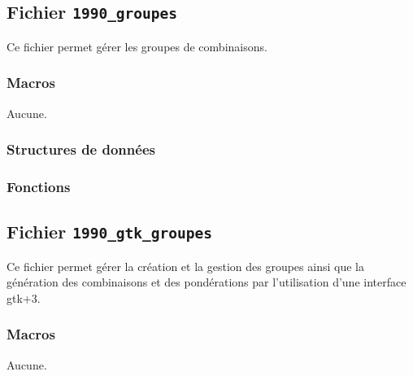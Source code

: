 \documentclass{article}
\begin{document}
\subsection{Fichier {\texttt{1990\_groupes}}}
Ce fichier permet gérer les groupes de combinaisons.
\subsubsection{Macros}
Aucune.
\subsubsection{Structures de données}




\subsubsection{Fonctions}
























\subsection{Fichier {\texttt{1990\_gtk\_groupes}}}
Ce fichier permet gérer la création et la gestion des groupes ainsi que la génération des combinaisons et des pondérations par l'utilisation d'une interface gtk+3.
\subsubsection{Macros}
Aucune.
\end{document}
